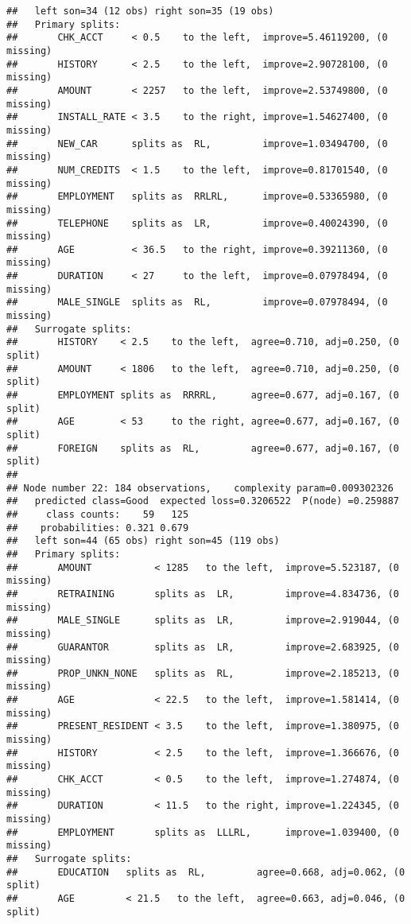 \documentclass[
]{article}
\begin{document}
\begin{verbatim}
##   left son=34 (12 obs) right son=35 (19 obs)
##   Primary splits:
##       CHK_ACCT     < 0.5    to the left,  improve=5.46119200, (0 missing)
##       HISTORY      < 2.5    to the left,  improve=2.90728100, (0 missing)
##       AMOUNT       < 2257   to the left,  improve=2.53749800, (0 missing)
##       INSTALL_RATE < 3.5    to the right, improve=1.54627400, (0 missing)
##       NEW_CAR      splits as  RL,         improve=1.03494700, (0 missing)
##       NUM_CREDITS  < 1.5    to the left,  improve=0.81701540, (0 missing)
##       EMPLOYMENT   splits as  RRLRL,      improve=0.53365980, (0 missing)
##       TELEPHONE    splits as  LR,         improve=0.40024390, (0 missing)
##       AGE          < 36.5   to the right, improve=0.39211360, (0 missing)
##       DURATION     < 27     to the left,  improve=0.07978494, (0 missing)
##       MALE_SINGLE  splits as  RL,         improve=0.07978494, (0 missing)
##   Surrogate splits:
##       HISTORY    < 2.5    to the left,  agree=0.710, adj=0.250, (0 split)
##       AMOUNT     < 1806   to the left,  agree=0.710, adj=0.250, (0 split)
##       EMPLOYMENT splits as  RRRRL,      agree=0.677, adj=0.167, (0 split)
##       AGE        < 53     to the right, agree=0.677, adj=0.167, (0 split)
##       FOREIGN    splits as  RL,         agree=0.677, adj=0.167, (0 split)
## 
## Node number 22: 184 observations,    complexity param=0.009302326
##   predicted class=Good  expected loss=0.3206522  P(node) =0.259887
##     class counts:    59   125
##    probabilities: 0.321 0.679 
##   left son=44 (65 obs) right son=45 (119 obs)
##   Primary splits:
##       AMOUNT           < 1285   to the left,  improve=5.523187, (0 missing)
##       RETRAINING       splits as  LR,         improve=4.834736, (0 missing)
##       MALE_SINGLE      splits as  LR,         improve=2.919044, (0 missing)
##       GUARANTOR        splits as  LR,         improve=2.683925, (0 missing)
##       PROP_UNKN_NONE   splits as  RL,         improve=2.185213, (0 missing)
##       AGE              < 22.5   to the left,  improve=1.581414, (0 missing)
##       PRESENT_RESIDENT < 3.5    to the left,  improve=1.380975, (0 missing)
##       HISTORY          < 2.5    to the left,  improve=1.366676, (0 missing)
##       CHK_ACCT         < 0.5    to the left,  improve=1.274874, (0 missing)
##       DURATION         < 11.5   to the right, improve=1.224345, (0 missing)
##       EMPLOYMENT       splits as  LLLRL,      improve=1.039400, (0 missing)
##   Surrogate splits:
##       EDUCATION   splits as  RL,         agree=0.668, adj=0.062, (0 split)
##       AGE         < 21.5   to the left,  agree=0.663, adj=0.046, (0 split)

\end{verbatim}
\end{document}
